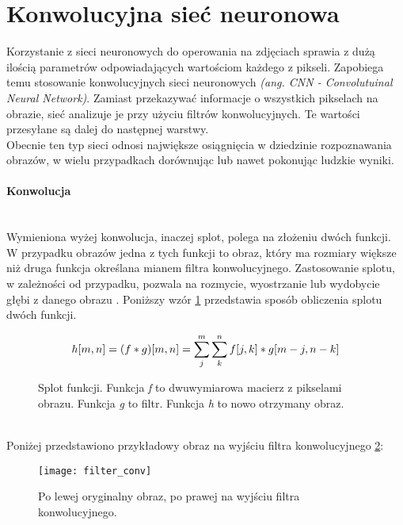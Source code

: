 \section{Konwolucyjna sieć neuronowa}

Korzystanie z sieci neuronowych do operowania na zdjęciach sprawia
z dużą ilością parametrów odpowiadających wartościom każdego z pikseli.
Zapobiega temu stosowanie konwolucyjnych sieci neuronowych \textit{(ang. CNN - Convolutuinal Neural Network)}.
Zamiast przekazywać informacje o wszystkich pikselach
na obrazie, sieć analizuje je przy użyciu filtrów konwolucyjnych.
Te wartości przesyłane są dalej do następnej warstwy.\\
Obecnie ten typ sieci odnosi największe osiągnięcia w dziedzinie rozpoznawania obrazów,
w wielu przypadkach dorównując lub nawet pokonując ludzkie wyniki.

\paragraph{Konwolucja} \mbox{}\\
Wymieniona wyżej konwolucja, inaczej splot, polega na złożeniu dwóch funkcji. W przypadku obrazów
jedna z tych funkcji to obraz, który ma rozmiary większe niż druga funkcja określana
mianem filtra konwolucyjnego. Zastosowanie splotu, w zależności od przypadku,
pozwala na rozmycie, wyostrzanie lub wydobycie głębi z danego obrazu \cite{konwolucja}.
Poniższy wzór \ref{eq:conv} przedstawia sposób obliczenia splotu dwóch funkcji.
\begin{figure}[h!]
\renewcommand{\figurename}{Wzór}%
\begin{equation*}
h[m, n] = (f * g)[m, n] = \sum_j^m \sum_k^n f[j, k] * g[m-j, n-k] \\
\end{equation*}
\centering
\captionsetup{justification=centering,margin=1cm}
\caption{Splot funkcji. Funkcja \textit{f} to dwuwymiarowa macierz z pikselami obrazu. Funkcja \textit{g} to filtr. Funkcja \textit{h} to nowo otrzymany obraz.}
\label{eq:conv}
\end{figure}\\
Poniżej przedstawiono przykładowy obraz na wyjściu filtra konwolucyjnego \ref{fig:filter_conv}:
\begin{figure}[h!]
\centering
\texttt{[image: filter\_conv]}
\centering
\caption{Po lewej oryginalny obraz, po prawej na wyjściu filtra konwolucyjnego.}
\label{fig:filter_conv}
\end{figure}

